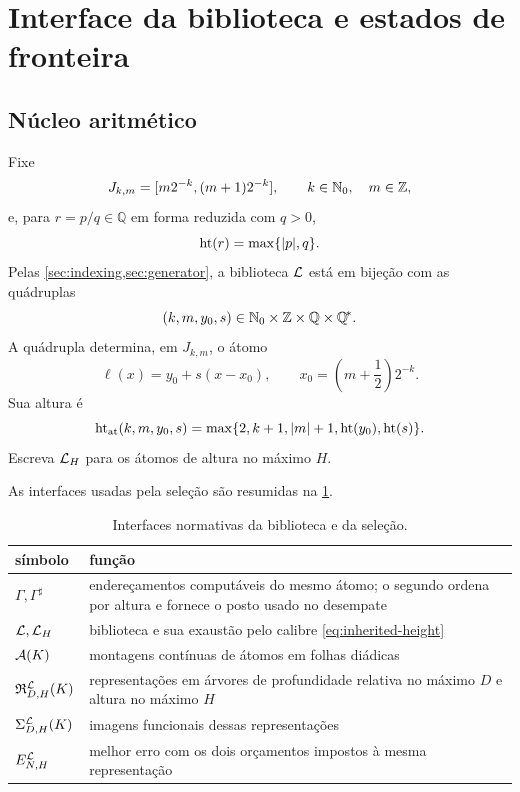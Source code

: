 \section{Interface da biblioteca e estados de fronteira}
\label{sec:interface}

\subsection{Núcleo aritmético}

Fixe
\[
 J_{k,m}=[m2^{-k},(m+1)2^{-k}],
 \qquad k\in\mathbb{N}_0,\quad m\in\mathbb Z,
\]
e, para $r=p/q\in\mathbb Q$ em forma reduzida com $q>0$,
\[
 \operatorname{ht}(r)=\max\{|p|,q\}.
\]
Pelas \cref{sec:indexing,sec:generator}, a biblioteca $\mathcal{L}$ está em bijeção com as
quádruplas
\[
 (k,m,y_0,s)\in\mathbb{N}_0\times\mathbb Z\times\mathbb Q\times\mathbb{Q}^{\!*}.
\]
A quádrupla determina, em $J_{k,m}$, o átomo
\begin{equation}
 \ell(x)=y_0+s(x-x_0),
 \qquad x_0=\left(m+\frac12\right)2^{-k}.
 \label{eq:inherited-atom}
\end{equation}
Sua altura é
\begin{equation}
 \operatorname{ht}_{\rm at}(k,m,y_0,s)
 =\max\{2,k+1,|m|+1,\operatorname{ht}(y_0),\operatorname{ht}(s)\}.
 \label{eq:inherited-height}
\end{equation}
Escreva $\mathcal{L}_H$ para os átomos de altura no máximo $H$.

As interfaces usadas pela seleção são resumidas na
\cref{tab:interfaces}.
\begin{table}[t]
 \centering
 \caption{Interfaces normativas da biblioteca e da seleção.}
 \label{tab:interfaces}
 \small
 \begin{tabularx}{\linewidth}{@{}lX@{}}
  \toprule
  símbolo & função\\
  \midrule
  $\Gamma,\Gamma^\sharp$ & endereçamentos computáveis do mesmo átomo; o
  segundo ordena por altura e fornece o posto usado no desempate\\
  $\mathcal{L},\mathcal{L}_H$ & biblioteca e sua exaustão pelo calibre
  \eqref{eq:inherited-height}\\
  $\mathcal{A}(K)$ & montagens contínuas de átomos em folhas diádicas\\
  $\mathfrak{R}_{D,H}^{\mathcal{L}}(K)$ & representações em árvores de
  profundidade relativa no máximo $D$ e altura no máximo $H$\\
  $\Sigma_{D,H}^{\mathcal{L}}(K)$ & imagens funcionais dessas representações\\
  $E_{N,H}^{\mathcal{L}}$ & melhor erro com os dois orçamentos impostos à mesma
  representação\\
  \bottomrule
 \end{tabularx}
\end{table}

